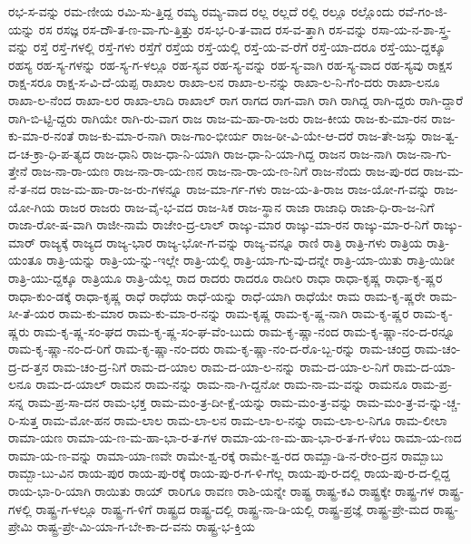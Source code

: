 {ರಭ-ಸ-ವನ್ನು
ರಮ-ಣೀಯ
ರಮಿ-ಸು-ತ್ತಿದ್ದ
ರಮ್ಯ
ರಮ್ಯ-ವಾದ
ರಲ್ಲ
ರಲ್ಲದೆ
ರಲ್ಲಿ
ರಲ್ಲೂ
ರಲ್ಲೊಂದು
ರವೆ-ಗಂ-ಜಿ-ಯನ್ನು
ರಸ
ರಸಜ್ಞ
ರಸ-ದೌ-ತ-ಣ-ವಾ-ಗು-ತ್ತಿತ್ತು
ರಸ-ಭ-ರಿ-ತ-ವಾದ
ರಸ-ವ-ತ್ತಾಗಿ
ರಸ-ವನ್ನು
ರಸಾ-ಯ-ನ-ಶಾ-ಸ್ತ್ರ-ವನ್ನು
ರಸ್ತೆ
ರಸ್ತೆ-ಗಳಲ್ಲಿ
ರಸ್ತೆ-ಗಳು
ರಸ್ತೆಗೆ
ರಸ್ತೆಯ
ರಸ್ತೆ-ಯಲ್ಲಿ
ರಸ್ತೆ-ಯ-ವ-ರೆಗೆ
ರಸ್ತೆ-ಯಾ-ದರೂ
ರಸ್ತೆ-ಯು-ದ್ದಕ್ಕೂ
ರಹಸ್ಯ
ರಹ-ಸ್ಯ-ಗಳನ್ನು
ರಹ-ಸ್ಯ-ಗ-ಳಲ್ಲೂ
ರಹ-ಸ್ಯವ
ರಹ-ಸ್ಯ-ವನ್ನು
ರಹ-ಸ್ಯ-ವಾಗಿ
ರಹ-ಸ್ಯ-ವಾದ
ರಹ-ಸ್ಯವು
ರಾಕ್ಷಸ
ರಾಕ್ಷ-ಸರೂ
ರಾಕ್ಷ-ಸ-ವಿ-ದೆ-ಯಪ್ಪ
ರಾಖಾಲ
ರಾಖಾ-ಲನ
ರಾಖಾ-ಲ-ನನ್ನು
ರಾಖಾ-ಲ-ನಿ-ಗೆಂ-ದರು
ರಾಖಾ-ಲನೂ
ರಾಖಾ-ಲ-ನೆಂದ
ರಾಖಾ-ಲರ
ರಾಖಾ-ಲಾದಿ
ರಾಖಾಲ್
ರಾಗ
ರಾಗದ
ರಾಗ-ವಾಗಿ
ರಾಗಿ
ರಾಗಿದ್ದ
ರಾಗಿ-ದ್ದರು
ರಾಗಿ-ದ್ದಾರೆ
ರಾಗಿ-ಬಿ-ಟ್ಟಿ-ದ್ದರು
ರಾಗಿಯೇ
ರಾಗಿ-ರು-ವಾಗ
ರಾಜ
ರಾಜ-ಮ-ಹಾ-ರಾ-ಜರು
ರಾಜ-ಕೀಯ
ರಾಜ-ಕು-ಮಾ-ರನ
ರಾಜ-ಕು-ಮಾ-ರ-ನಂತೆ
ರಾಜ-ಕು-ಮಾ-ರ-ನಾಗಿ
ರಾಜ-ಗಾಂ-ಭೀರ್ಯ
ರಾಜ-ಠೀ-ವಿ-ಯೇ-ಆ-ದರೆ
ರಾಜ-ತೇ-ಜಸ್ಸು
ರಾಜ-ತ್ವ-ದ-ಚ-ಕ್ರಾ-ಧಿ-ಪ-ತ್ಯದ
ರಾಜ-ಧಾನಿ
ರಾಜ-ಧಾ-ನಿ-ಯಾಗಿ
ರಾಜ-ಧಾ-ನಿ-ಯಾ-ಗಿದ್ದ
ರಾಜನ
ರಾಜ-ನಾಗಿ
ರಾಜ-ನಾ-ಗು-ತ್ತೇನೆ
ರಾಜ-ನಾ-ರಾ-ಯಣ
ರಾಜ-ನಾ-ರಾ-ಯ-ಣನ
ರಾಜ-ನಾ-ರಾ-ಯ-ಣ-ನಿಗೆ
ರಾಜ-ನೆಂದು
ರಾಜ-ಪು-ರದ
ರಾಜ-ಮ-ನೆ-ತ-ನದ
ರಾಜ-ಮ-ಹಾ-ರಾ-ಜ-ರು-ಗಳನ್ನೂ
ರಾಜ-ಮಾ-ರ್ಗ-ಗಳು
ರಾಜ-ಯ-ತಿ-ರಾಜ
ರಾಜ-ಯೋ-ಗ-ವನ್ನು
ರಾಜ-ಯೋ-ಗಿಯ
ರಾಜರ
ರಾಜರು
ರಾಜ-ವೈ-ಭ-ವದ
ರಾಜ-ಸಿಕ
ರಾಜ-ಸ್ಥಾನ
ರಾಜಾ
ರಾಜಾಧಿ
ರಾಜಾ-ಧಿ-ರಾ-ಜ-ನಿಗೆ
ರಾಜಾ-ರೋ-ಷ-ವಾಗಿ
ರಾಜೀ-ನಾಮೆ
ರಾಜೇಂ-ದ್ರ-ಲಾಲ್
ರಾಜ್ಕು-ಮಾರ
ರಾಜ್ಕು-ಮಾ-ರನ
ರಾಜ್ಕು-ಮಾ-ರ-ನಿಗೆ
ರಾಜ್ಕು-ಮಾರ್
ರಾಜ್ಯಕ್ಕೆ
ರಾಜ್ಯದ
ರಾಜ್ಯ-ಭಾರ
ರಾಜ್ಯ-ಭೋ-ಗ-ವನ್ನು
ರಾಜ್ಯ-ವನ್ನೂ
ರಾಣಿ
ರಾತ್ರಿ
ರಾತ್ರಿ-ಗಳು
ರಾತ್ರಿಯ
ರಾತ್ರಿ-ಯಂತೂ
ರಾತ್ರಿ-ಯನ್ನು
ರಾತ್ರಿ-ಯ-ನ್ನು-ಇಲ್ಲೇ
ರಾತ್ರಿ-ಯಲ್ಲಿ
ರಾತ್ರಿ-ಯಾ-ಗು-ವು-ದನ್ನೇ
ರಾತ್ರಿ-ಯಾ-ಯಿತು
ರಾತ್ರಿ-ಯಿಡೀ
ರಾತ್ರಿ-ಯು-ದ್ದಕ್ಕೂ
ರಾತ್ರಿಯೂ
ರಾತ್ರಿ-ಯೆಲ್ಲ
ರಾದ
ರಾದರು
ರಾದರೂ
ರಾದೀರಿ
ರಾಧಾ
ರಾಧಾ-ಕೃಷ್ಣ
ರಾಧಾ-ಕೃ-ಷ್ಣರ
ರಾಧಾ-ಕುಂ-ಡಕ್ಕೆ
ರಾಧಾ-ಕೃಷ್ಣ
ರಾಧೆ
ರಾಧೆಯ
ರಾಧೆ-ಯನ್ನು
ರಾಧೆ-ಯಾಗಿ
ರಾಧೆಯೇ
ರಾಮ
ರಾಮ-ಕೃ-ಷ್ಣರೇ
ರಾಮ-ಸೀ-ತೆ-ಯರ
ರಾಮ-ಕು-ಮಾರ
ರಾಮ-ಕು-ಮಾ-ರ-ನನ್ನು
ರಾಮ-ಕೃಷ್ಣ
ರಾಮ-ಕೃ-ಷ್ಣ-ನಾಗಿ
ರಾಮ-ಕೃ-ಷ್ಣರ
ರಾಮ-ಕೃ-ಷ್ಣರು
ರಾಮ-ಕೃ-ಷ್ಣ-ಸಂ-ಘದ
ರಾಮ-ಕೃ-ಷ್ಣ-ಸಂ-ಘ-ವೆಂ-ಬುದು
ರಾಮ-ಕೃ-ಷ್ಣಾ-ನಂದ
ರಾಮ-ಕೃ-ಷ್ಣಾ-ನಂ-ದ-ರನ್ನೂ
ರಾಮ-ಕೃ-ಷ್ಣಾ-ನಂ-ದ-ರಿಗೆ
ರಾಮ-ಕೃ-ಷ್ಣಾ-ನಂ-ದರು
ರಾಮ-ಕೃ-ಷ್ಣಾ-ನಂ-ದ-ರೊ-ಬ್ಬ-ರನ್ನು
ರಾಮ-ಚಂದ್ರ
ರಾಮ-ಚಂ-ದ್ರ-ದ-ತ್ತನ
ರಾಮ-ಚಂ-ದ್ರ-ನಿಗೆ
ರಾಮ-ದ-ಯಾಲ
ರಾಮ-ದ-ಯಾ-ಲ-ನನ್ನು
ರಾಮ-ದ-ಯಾ-ಲ-ನಿಗೆ
ರಾಮ-ದ-ಯಾ-ಲನೂ
ರಾಮ-ದ-ಯಾಲ್
ರಾಮನ
ರಾಮ-ನನ್ನು
ರಾಮ-ನಾ-ಗಿ-ದ್ದನೋ
ರಾಮ-ನಾ-ಮ-ವನ್ನು
ರಾಮನೂ
ರಾಮ-ಪ್ರ-ಸನ್ನ
ರಾಮ-ಪ್ರ-ಸಾ-ದನ
ರಾಮ-ಭಕ್ತ
ರಾಮ-ಮಂ-ತ್ರ-ದೀ-ಕ್ಷೆ-ಯನ್ನು
ರಾಮ-ಮಂ-ತ್ರ-ವನ್ನು
ರಾಮ-ಮಂ-ತ್ರ-ವ-ನ್ನು-ಚ್ಚ-ರಿ-ಸುತ್ತ
ರಾಮ-ಮೋ-ಹನ
ರಾಮ-ಲಾಲ
ರಾಮ-ಲಾ-ಲನ
ರಾಮ-ಲಾ-ಲ-ನನ್ನು
ರಾಮ-ಲಾ-ಲ-ನಿಗೂ
ರಾಮ-ಲೀಲಾ
ರಾಮಾ-ಯಣ
ರಾಮಾ-ಯ-ಣ-ಮ-ಹಾ-ಭಾ-ರ-ತ-ಗಳ
ರಾಮಾ-ಯ-ಣ-ಮ-ಹಾ-ಭಾ-ರ-ತ-ಗ-ಳೆಂಬ
ರಾಮಾ-ಯ-ಣದ
ರಾಮಾ-ಯ-ಣ-ವನ್ನು
ರಾಮಾ-ಯಾ-ಣವೇ
ರಾಮೇ-ಶ್ವ-ರಕ್ಕೆ
ರಾಮೇ-ಶ್ವ-ರದ
ರಾಮ್ಖಾ-ಡಿ-ನ-ರೇಂ-ದ್ರನ
ರಾಮ್ಬಾಬು
ರಾಮ್ಬಾ-ಬು-ವಿನ
ರಾಯ-ಪುರ
ರಾಯ-ಪು-ರಕ್ಕೆ
ರಾಯ-ಪು-ರ-ಗ-ಳಿ-ಗೆಲ್ಲ
ರಾಯ-ಪು-ರ-ದಲ್ಲಿ
ರಾಯ-ಪು-ರ-ದ-ಲ್ಲಿದ್ದ
ರಾಯ-ಭಾ-ರಿ-ಯಾಗಿ
ರಾಯಿತು
ರಾಯ್
ರಾರಿಗೂ
ರಾವಣ
ರಾಶಿ-ಯನ್ನೇ
ರಾಷ್ಟ್ರ
ರಾಷ್ಟ್ರ-ಕವಿ
ರಾಷ್ಟ್ರಕ್ಕೇ
ರಾಷ್ಟ್ರ-ಗಳ
ರಾಷ್ಟ್ರ-ಗಳಲ್ಲಿ
ರಾಷ್ಟ್ರ-ಗ-ಳಲ್ಲೂ
ರಾಷ್ಟ್ರ-ಗ-ಳಿಗೆ
ರಾಷ್ಟ್ರದ
ರಾಷ್ಟ್ರ-ದಲ್ಲಿ
ರಾಷ್ಟ್ರ-ನಾ-ಡಿ-ಯಲ್ಲಿ
ರಾಷ್ಟ್ರ-ಪ್ರಜ್ಞೆ
ರಾಷ್ಟ್ರ-ಪ್ರೇ-ಮದ
ರಾಷ್ಟ್ರ-ಪ್ರೇಮಿ
ರಾಷ್ಟ್ರ-ಪ್ರೇ-ಮಿ-ಯಾ-ಗ-ಬೇ-ಕಾ-ದ-ವನು
ರಾಷ್ಟ್ರ-ಭ-ಕ್ತಿಯ
}
